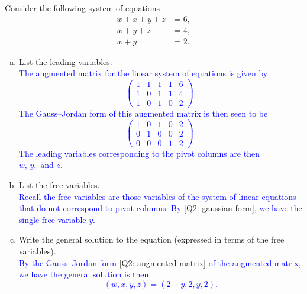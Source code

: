 \documentclass[a4paper,11pt]{article}
\newcommand{\BB}[1]{\textcolor{blue}{#1}}
\begin{document}
 Consider the following system of equations
\begin{align*}
  w + x + y + z &= 6, \\
  w + y + z &= 4, \\
  w + y &=2.
\end{align*}
\begin{enumerate}[(a)]
\item List the leading variables. \\

  \BB{
    The augmented matrix for the linear system of equations is given by
    \begin{equation}\label{Q2: augmented matrix}
      \left(
        \begin{array}{cccc|c}
          1 & 1 & 1 & 1 & 6 \\
          1 & 0 & 1 & 1 & 4 \\
          1 & 0 & 1 & 0 & 2
        \end{array}
      \right).
    \end{equation}
    The Gauss--Jordan form of this augmented matrix is then seen to be
    \begin{equation}\label{Q2: gaussian form}
      \left(
        \begin{array}{cccc|c}
          1 & 0 & 1 & 0 & 2 \\
          0 & 1 & 0 & 0 & 2 \\
          0 & 0 & 0 & 1 & 2
        \end{array}
      \right).
    \end{equation}
    The leading variables corresponding to the pivot columns are then
    $w,\,y,\text{ and }z$. \\
  }

\item List the free variables. \\

  \BB{
    Recall the free variables are those variables of the system of linear
    equations that do not correspond to pivot columns. By \eqref{Q2: gaussian
      form}, we have the single free variable $y$. \\
  }

\item Write the general solution to the equation (expressed in terms of the free
  variables). \\

  \BB{
    By the Gauss--Jordan form \eqref{Q2: augmented matrix} of the augmented
    matrix, we have the general solution is then
    \[
      (w,x,y,z) = (2-y,2,y,2).
    \]
  }


\end{enumerate}
\end{document}
